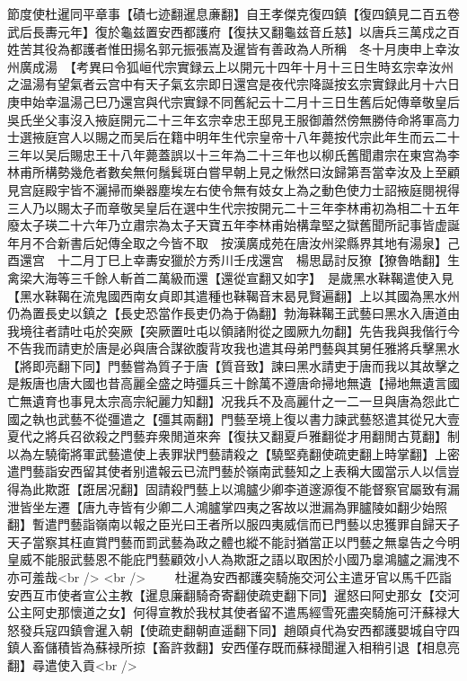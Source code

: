 節度使杜暹同平章事【磧七迹翻暹息亷翻】自王孝傑克復四鎮【復四鎮見二百五卷武后長夀元年】復於龜兹置安西都護府【復扶又翻龜兹音丘慈】以唐兵三萬戍之百姓苦其役為都護者惟田揚名郭元振張嵩及暹皆有善政為人所稱　冬十月庚申上幸汝州廣成湯　【考異曰令狐峘代宗實録云上以開元十四年十月十三日生時玄宗幸汝州之温湯有望氣者云宫中有天子氣玄宗即日還宫是夜代宗降誕按玄宗實録此月十六日庚申始幸温湯己巳乃還宫與代宗實録不同舊紀云十二月十三日生舊后妃傳章敬皇后吳氏坐父事沒入掖庭開元二十三年玄宗幸忠王邸見王服御蕭然傍無勝侍命將軍高力士選掖庭宫人以賜之而吴后在籍中明年生代宗皇帝十八年薨按代宗此年生而云二十三年以吴后賜忠王十八年薨蓋誤以十三年為二十三年也以柳氏舊聞肅宗在東宫為李林甫所構勢幾危者數矣無何鬚鬂斑白嘗早朝上見之愀然曰汝歸第吾當幸汝及上至顧見宫庭殿宇皆不灑掃而樂器塵埃左右使令無有妓女上為之動色使力士詔掖庭閱視得三人乃以賜太子而章敬吴皇后在選中生代宗按開元二十三年李林甫初為相二十五年廢太子瑛二十六年乃立肅宗為太子天寶五年李林甫始構韋堅之獄舊聞所記事皆虚誕年月不合新書后妃傳全取之今皆不取　按漢廣成苑在唐汝州梁縣界其地有湯泉】己酉還宫　十二月丁巳上幸夀安獵於方秀川壬戌還宫　楊思勗討反獠【獠魯皓翻】生禽梁大海等三千餘人斬首二萬級而還【還從宣翻又如字】　是歲黑水靺鞨遣使入見【黑水靺鞨在流鬼國西南女貞即其遣種也靺鞨音末曷見賢遍翻】上以其國為黑水州仍為置長史以鎮之【長史恐當作長吏仍為于偽翻】勃海靺鞨王武藝曰黑水入唐道由我境往者請吐屯於突厥【突厥置吐屯以領諸附從之國厥九勿翻】先告我與我偕行今不告我而請吏於唐是必與唐合謀欲腹背攻我也遣其母弟門藝與其舅任雅將兵擊黑水【將即亮翻下同】門藝嘗為質子于唐【質音致】諫曰黑水請吏于唐而我以其故擊之是叛唐也唐大國也昔高麗全盛之時彊兵三十餘萬不遵唐命掃地無遺【掃地無遺言國亡無遺育也事見太宗高宗紀麗力知翻】况我兵不及高麗什之一二一旦與唐為怨此亡國之執也武藝不從彊遣之【彊其兩翻】門藝至境上復以書力諫武藝怒遣其從兄大壹夏代之將兵召欲殺之門藝弃衆閒道來奔【復扶又翻夏戶雅翻從才用翻閒古莧翻】制以為左驍衛將軍武藝遣使上表罪狀門藝請殺之【驍堅堯翻使疏吏翻上時掌翻】上密遣門藝詣安西留其使者别遣報云已流門藝於嶺南武藝知之上表稱大國當示人以信豈得為此欺誑【誑居况翻】固請殺門藝上以鴻臚少卿李道邃源復不能督察官屬致有漏泄皆坐左遷【唐九寺皆有少卿二人鴻臚掌四夷之客故以泄漏為罪臚陵如翻少始照翻】暫遣門藝詣嶺南以報之臣光曰王者所以服四夷威信而已門藝以忠獲罪自歸天子天子當察其枉直賞門藝而罰武藝為政之體也縱不能討猶當正以門藝之無辠告之今明皇威不能服武藝恩不能庇門藝顧效小人為欺誑之語以取困於小國乃辠鴻臚之漏洩不亦可羞哉<br />
<br />
　　杜暹為安西都護突騎施交河公主遣牙官以馬千匹詣安西互市使者宣公主教【暹息廉翻騎奇寄翻使疏吏翻下同】暹怒曰阿史那女【交河公主阿史那懷道之女】何得宣教於我杖其使者留不遣馬經雪死盡突騎施可汗蘇禄大怒發兵寇四鎮會暹入朝【使疏吏翻朝直遥翻下同】趙頤貞代為安西都護嬰城自守四鎮人畜儲積皆為蘇禄所掠【畜許救翻】安西僅存既而蘇禄聞暹入相稍引退【相息亮翻】尋遣使入貢<br />
